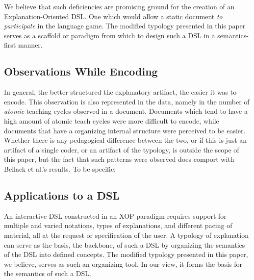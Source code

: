 \documentclass[conference]{IEEEtran}
\begin{document}
We believe that such deficiencies are promising ground for the creation of an
Explanation-Oriented DSL. One which would allow a static document \emph{to
  participate} in the language game. The modified typology presented in this
paper serves as a scaffold or paradigm from which to design such a DSL in a
semantics-first \cite{EW11sle}  manner.

\subsection{Observations While Encoding}
In general, the better structured the explanatory artifact, the easier it was to
encode. This observation is also represented in the data, namely in the number
of \emph{atomic} teaching cycles observed in a document. Documents which tend to
have a high amount of atomic teach cycles were more difficult to encode, while
documents that have a organizing internal structure were perceived to be easier.
Whether there is any pedagogical difference between the two, or if this is just
an artifact of a single coder, or an artifact of the typology, is outside the
scope of this paper, but the fact that such patterns were observed does comport
with Bellack et al.'s results. To be specific:


\subsection{Applications to a DSL}
An interactive DSL constructed in an XOP paradigm requires support for multiple
and varied notations, types of explanations, and different pacing of material,
all at the request or specification of the user. A typology of explanation can
serve as the basis, the backbone, of such a DSL by organizing the semantics of
the DSL into defined concepts. The modified typology presented in this paper, we
believe, serves as such an organizing tool. In our view, it forms the basis for
the semantics of such a DSL.
\end{document}
